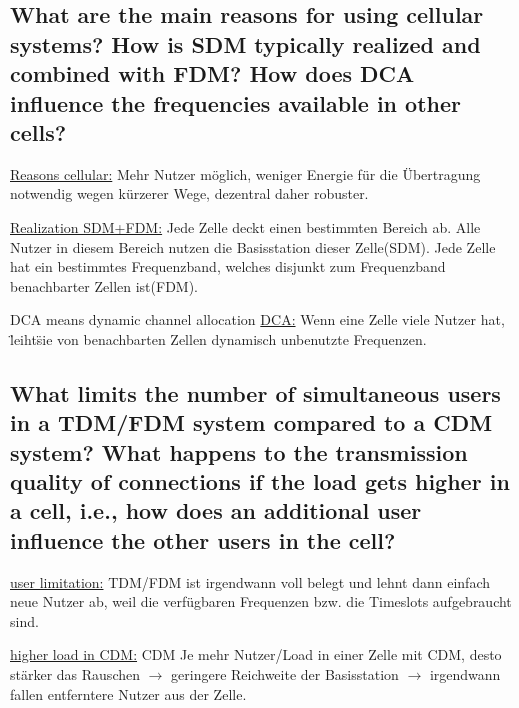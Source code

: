 \subsection{What are the main reasons for using cellular systems? How is SDM typically realized
and combined with FDM? How does DCA influence the frequencies available in other
cells?}
\underline{Reasons cellular:} Mehr Nutzer möglich, weniger Energie für die Übertragung notwendig wegen kürzerer Wege, dezentral daher robuster.

\underline{Realization SDM+FDM:} Jede Zelle deckt einen bestimmten Bereich ab. Alle Nutzer in diesem Bereich nutzen die Basisstation dieser Zelle(SDM).
Jede Zelle hat ein bestimmtes Frequenzband, welches disjunkt zum Frequenzband benachbarter Zellen ist(FDM). 

DCA means dynamic channel allocation
\underline{DCA:} Wenn eine Zelle viele Nutzer hat, \"leiht\" sie von benachbarten Zellen dynamisch unbenutzte Frequenzen.

\subsection{What limits the number of simultaneous users in a TDM/FDM system compared to a
CDM system? What happens to the transmission quality of connections if the load
gets higher in a cell, i.e., how does an additional user influence the other users in the
cell?}
\underline{user limitation:} TDM/FDM ist irgendwann voll belegt und lehnt dann einfach neue Nutzer ab, weil die verfügbaren Frequenzen bzw. die Timeslots aufgebraucht sind.

\underline{higher load in CDM:} CDM Je mehr Nutzer/Load in einer Zelle mit CDM, desto stärker das Rauschen $\rightarrow$ geringere Reichweite der Basisstation $\rightarrow$ irgendwann fallen entferntere Nutzer aus der Zelle.



